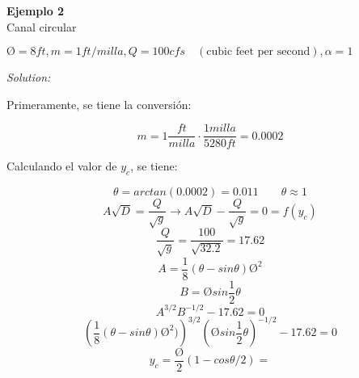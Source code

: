 \documentclass[a4paper, 11pt]{article}
\newenvironment{ejemplo}[2][Ejemplo]
    { \begin{mdframed}[backgroundcolor=gray!20] \textbf{#1 #2} \\}
    {  \end{mdframed}}
\newenvironment{solution}
    {\textit{Solution:}}
    {}
\begin{document}
\begin{ejemplo}{2}
    Canal circular

    $Ø=8ft, m=1ft/milla, Q=100 cfs \quad (\text{cubic feet per second}), \alpha=1$

    \begin{solution}
    
    Primeramente, se tiene la conversión:

    $$m=1\dfrac{ft}{milla}\cdot\dfrac{1milla}{5280ft}=0.0002$$

    Calculando el valor de $y_c$, se tiene:

    $$\theta=arctan(0.0002)=0.011  \qquad \theta \approx 1$$
    $$A\sqrt{D}=\dfrac{Q}{\sqrt{g}}\rightarrow A\sqrt{D}-\dfrac{Q}{\sqrt{g}}=0=f(y_c)$$
    $$\dfrac{Q}{\sqrt{g}}=\dfrac{100}{\sqrt{32.2}}=17.62$$
    $$A=\dfrac{1}{8}(\theta-sin\theta)Ø^{2}$$
    $$B=Øsin\dfrac{1}{2}\theta$$
    $$A^{3/2}B^{-1/2}-17.62=0$$
    $$\left(\dfrac{1}{8}(\theta-sin\theta)Ø^{2})\right)^{3/2}\left(Øsin\dfrac{1}{2}\theta\right)^{-1/2}-17.62=0$$
    $$y_c=\dfrac{Ø}{2}(1-cos\theta/2)=$$
    \end{solution}

    
\end{ejemplo}

    





    
\end{document}
